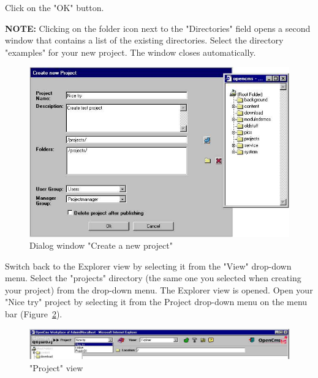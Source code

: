 Click on the "OK" button.

\textbf{NOTE:} Clicking on the folder icon next to the
"Directories" field opens a second window that contains a list of
the existing directories. Select the directory "examples" for your
new project. The window closes automatically.

\begin{figure}[h]
\begin{center}
\includegraphics[width=\sgw]
                   {pics/usermanual/newProject}
\caption[Dialog window "Create a new project"]
           {Dialog window "Create a new project"}
\label{createnewproject}
\end{center}
\end{figure}

Switch back to the Explorer view by selecting it from the "View"
drop-down menu. Select the "projects" directory (the same one you
selected when creating your project) from the drop-down menu. The
Explorer view is opened. Open your "Nice try" project by selecting
it from the Project drop-down menu on the menu bar
(Figure~\ref{projectview}).

\begin{figure}[hbt]
\begin{center}
\includegraphics[width=\sgw]
                   {pics/usermanual/projectView}
\caption["Project" view]
           {"Project" view}
\label{projectview}
\end{center}
\end{figure}

